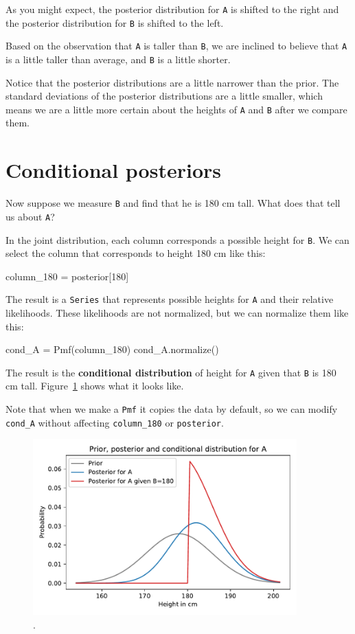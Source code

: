\documentclass[12pt]{book}
\theoremstyle{exercise}
\newcommand{\py}[1]{{\tt #1}}%
\begin{document}
As you might expect, the posterior distribution for \py{A} is shifted to the right and the posterior distribution for \py{B} is shifted to the left.

Based on the observation that \py{A} is taller than \py{B}, we are inclined to believe that \py{A} is a little taller than average, and \py{B} is a little shorter.

Notice that the posterior distributions are a little narrower than the prior.
The standard deviations of the posterior distributions are a little smaller, which means we are a little more certain about the heights of \py{A} and \py{B} after we compare them.


\section{Conditional posteriors}

Now suppose we measure \py{B} and find that he is 180 cm tall.  What does that tell us about \py{A}?

In the joint distribution, each column corresponds a possible height for \py{B}.  We can select the column that corresponds to height 180 cm like this:

\begin{code}
column_180 = posterior[180]
\end{code}

The result is a \py{Series} that represents possible heights for \py{A} and their relative likelihoods.
These likelihoods are not normalized, but we can normalize them like this:

\begin{code}
cond_A = Pmf(column_180)
cond_A.normalize()
\end{code}

The result is the {\bf conditional distribution} of height for \py{A} given that \py{B} is 180 cm tall.
Figure~\ref{fig09-05} shows what it looks like.

Note that when we make a \py{Pmf} it copies the data by default, so we can modify \py{cond_A} without affecting \py{column_180} or \py{posterior}.

\begin{figure}
\centerline{\includegraphics[width=4in]{figs/fig09-05.pdf}}
\caption{.}
\label{fig09-05}
\end{figure}
\end{document}

